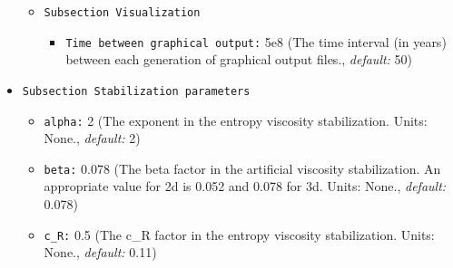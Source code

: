 \begin{itemize}
\begin{itemize}
\item {\tt Subsection Visualization}
\begin{itemize}
\item {\tt Time between graphical output:} 5e8 (The time interval (in years) between each generation of graphical output files., {\it default:} 50)
\end{itemize}
\end{itemize}

\item {\tt Subsection Stabilization parameters}
\begin{itemize}
\item {\tt alpha:} 2 (The exponent in the entropy viscosity stabilization. Units: None., {\it default:} 2)
\item {\tt beta:} 0.078 (The beta factor in the artificial viscosity stabilization. An appropriate value for 2d is 0.052 and 0.078 for 3d. Units: None., {\it default:} 0.078)
\item {\tt c\_R:} 0.5 (The c\_R factor in the entropy viscosity stabilization. Units: None., {\it default:} 0.11)
\end{itemize}
\end{itemize}
